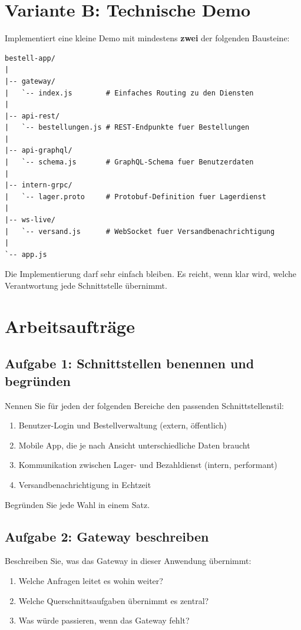 \documentclass[a4paper,12pt]{article}
\begin{document}
\section*{Variante B: Technische Demo}

Implementiert eine kleine Demo mit mindestens \textbf{zwei} der folgenden Bausteine:

\begin{lstlisting}
bestell-app/
|
|-- gateway/
|   `-- index.js        # Einfaches Routing zu den Diensten
|
|-- api-rest/
|   `-- bestellungen.js # REST-Endpunkte fuer Bestellungen
|
|-- api-graphql/
|   `-- schema.js       # GraphQL-Schema fuer Benutzerdaten
|
|-- intern-grpc/
|   `-- lager.proto     # Protobuf-Definition fuer Lagerdienst
|
|-- ws-live/
|   `-- versand.js      # WebSocket fuer Versandbenachrichtigung
|
`-- app.js
\end{lstlisting}

Die Implementierung darf sehr einfach bleiben. Es reicht, wenn klar wird, welche
Verantwortung jede Schnittstelle übernimmt.

\section*{Arbeitsaufträge}

\subsection*{Aufgabe 1: Schnittstellen benennen und begründen}
Nennen Sie für jeden der folgenden Bereiche den passenden Schnittstellenstil:
\begin{enumerate}
\item Benutzer-Login und Bestellverwaltung (extern, öffentlich)
\item Mobile App, die je nach Ansicht unterschiedliche Daten braucht
\item Kommunikation zwischen Lager- und Bezahldienst (intern, performant)
\item Versandbenachrichtigung in Echtzeit
\end{enumerate}
Begründen Sie jede Wahl in einem Satz.

\subsection*{Aufgabe 2: Gateway beschreiben}
Beschreiben Sie, was das Gateway in dieser Anwendung übernimmt:
\begin{enumerate}
\item Welche Anfragen leitet es wohin weiter?
\item Welche Querschnittsaufgaben übernimmt es zentral?
\item Was würde passieren, wenn das Gateway fehlt?
\end{enumerate}
\end{document}
